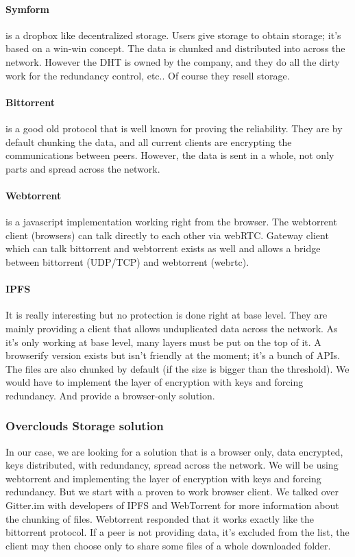 \paragraph{Symform} is a dropbox like decentralized storage. Users give storage to obtain storage; it's based on a win-win concept. The data is chunked and distributed into across the network. However the DHT is owned by the company, and they do all the dirty work for the redundancy control, etc.. Of course they resell storage.

\paragraph{Bittorrent\cite{Ferreira2012ContentBitTorrent}} is a good old protocol that is well known for proving the reliability. They are by default chunking the data, and all current clients are encrypting the communications between peers. However, the data is sent in a whole, not only parts and spread across the network.

\paragraph{Webtorrent\cite{Sivek2004WebTorrent:Servers}} is a javascript implementation working right from the browser. The webtorrent client (browsers) can talk directly to each other via webRTC. Gateway client which can talk bittorrent and webtorrent exists as well and allows a bridge between bittorrent (UDP/TCP) and webtorrent (webrtc).

\paragraph{IPFS\cite{BenetIPFS3}} It is really interesting but no protection is done right at base level. They are mainly providing a client that allows unduplicated data across the network. As it's only working at base level, many layers must be put on the top of it. A browserify version exists but isn't friendly at the moment; it's a bunch of APIs. The files are also chunked by default (if the size is bigger than the threshold). We would have to implement the layer of encryption with keys and forcing redundancy. And provide a browser-only solution.

\subsubsection{Overclouds Storage solution} In our case, we are looking for a solution that is a browser only, data encrypted, keys distributed, with redundancy, spread across the network. We will be using webtorrent and implementing the layer of encryption with keys and forcing redundancy. But we start with a proven to work browser client. We talked over Gitter.im with developers of IPFS and WebTorrent for more information about the chunking of files. Webtorrent responded that it works exactly like the bittorrent protocol. If a peer is not providing data, it's excluded from the list, the client may then choose only to share some files of a whole downloaded folder.



